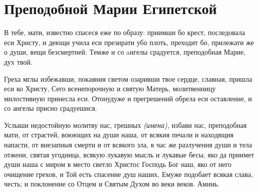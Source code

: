 \mychapterending[1]


\section{Преподобной Марии  Египетской}\begin{mymulticols}


В тебе, мати, известно спасеся еже по образу: приимши бо крест, последовала еси Христу, и деющи учила еси презирати убо плоть, преходит бо, прилежати же о души, вещи безсмертней. Темже и со aнгелы срадуется, преподобная Марие, дух твой.


Греха мглы избежавши, покаяния светом озаривши твое сердце, славная, пришла еси ко Христу, Сего всенепорочную и святую Матерь, молитвенницу милостивную принесла еси. Отонудуже и прегрешений обрела еси оставление, и со ангелы присно срадуешися.


Услыши недостойную молитву нас, грешных {\itshape (имена),} избави нас, преподобная мати, от страстей, воюющих на души наша, от всякия печали и находящия напасти, от внезапныя смерти и от всякого зла, в час же разлучения души и тела отжени, святая угодница, всякую лукавую мысль и лукавые бесы, яко да приимет души наша с миром в место светло Христос Господь Бог наш, яко от него очищение грехов, и Той есть спасение душ наших, Емуже подобает всякая слава, честь; и поклонение со Отцем и Святым Духом во веки веков. Аминь.

\end{mymulticols}

